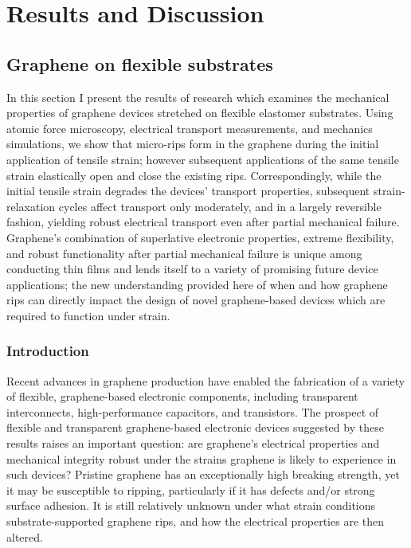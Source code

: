 \documentclass[edeposit,fullpage,draftthesis]{uiucthesis2009}
\begin{document}
            
    
\chapter{Results and Discussion}

\section{Graphene on flexible substrates}

    In this section I present the results of research which examines
    the mechanical properties of graphene devices stretched on flexible
    elastomer substrates. Using atomic force microscopy, electrical transport
    measurements, and mechanics simulations, we show that micro-rips form in the
    graphene during the initial application of tensile strain; however subsequent
    applications of the same tensile strain elastically open and close the existing
    rips. Correspondingly, while the initial tensile strain degrades the devices'
    transport properties, subsequent strain-relaxation cycles affect transport only
    moderately, and in a largely reversible fashion, yielding robust electrical
    transport even after partial mechanical failure. Graphene's combination of
    superlative electronic properties, extreme flexibility, and robust
    functionality after partial mechanical failure is unique among conducting thin
    films and lends itself to a variety of promising future device applications;
    the new understanding provided here of when and how graphene rips can directly
    impact the design of novel graphene-based devices which are required to
    function under strain.
    
    \subsection{Introduction}
    
        Recent advances in graphene production\cite{Kim2009, Bae2010, Lee2010} have
        enabled the fabrication of a variety of flexible, graphene-based electronic
        components, including transparent interconnects\cite{Kim2011}, high-performance
        capacitors\cite{El-Kady2012}, and transistors\cite{Lee2011}. The prospect of
        flexible and transparent graphene-based electronic devices suggested by these
        results raises an important question: are graphene's electrical properties and
        mechanical integrity robust under the strains graphene is likely to experience
        in such devices? Pristine graphene has an exceptionally high breaking
        strength\cite{Lee2008}, yet it may be susceptible to ripping, particularly if
        it has defects \cite{Kim2012} and/or strong  surface adhesion\cite{Sen2010}. It
        is still relatively unknown under what strain conditions substrate-supported
        graphene rips, and how the electrical properties are then altered.
        
\end{document}
